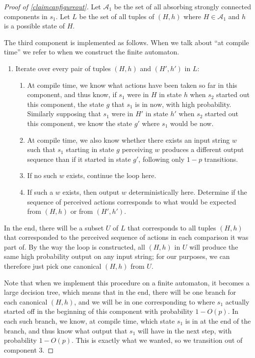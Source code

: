 \documentclass[11pt]{amsart}
\theoremstyle{definition}
\theoremstyle{remark}
\begin{document}
      \begin{proof}[Proof of \cref{claimcanfigureout}]
        
          Let $\mathcal{A}_1$ be the set of all absorbing strongly connected components in $s_1$.
           Let $L$ be the set of all tuples of $(H, h)$ where $H \in \mathcal{A}_1$ and $h$ is a possible state of $H$. 

        The third component is implemented as follows. When we talk about ``at compile time'' we refer to when we construct the finite automaton.
        \begin{enumerate}
          \item Iterate over every pair of tuples $(H,h)$ and $(H', h')$ in $L$:
          \begin{enumerate}
            \item At compile time, we know what actions have been taken so far in this component, and thus know, if $s_1$ were in $H$ in state $h$ when $s_2$ started out this component, the state $g$ that $s_1$ is in now, with high probability. Similarly supposing that $s_1$ were in $H'$ in state $h'$ when $s_2$ started out this component, we know the state $g'$ where $s_1$ would be now.
            \item At compile time, we also know whether there exists an input string $w$ such that $s_1$ starting in state $g$ perceiving $w$ produces a different output sequence than if it started in state $g'$, following only $1-p$ transitions.
            \item If no such $w$ exists, continue the loop here.
            \item If such a $w$ exists, then output $w$ deterministically here. Determine if the sequence of perceived actions corresponds to what would be expected from $(H,h)$ or from $(H', h')$.
          \end{enumerate}
        \end{enumerate}
        In the end, there will be a subset $U$ of $L$ that corresponds to all tuples $(H,h)$ that corresponded to the perceived sequence of actions in each comparison it was part of. By the way the loop is constructed, all $(H,h)$ in $U$ will produce the same high probability output on any input string; for our purposes, we can therefore just pick one canonical $(H,h)$ from $U$.

        Note that when we implement this procedure on a finite automaton, it becomes a large decision tree, which means that in the end, there will be one branch for each canonical $(H, h)$, and we will be in one corresponding to where $s_1$ actually started off in the beginning of this component with probability $1 - O(p)$. In each such branch, we know, at compile time, which state $s_1$ is in at the end of the branch, and thus know what output that $s_1$ will have in the next step, with probability $1 - O(p)$. This is exactly what we wanted, so we transition out of component 3.
      \end{proof}
\end{document}
